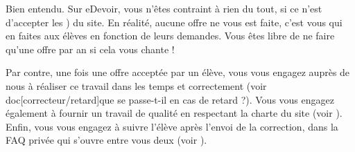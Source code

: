 ﻿Bien entendu. Sur eDevoir, vous n'êtes contraint à rien du tout, si ce n'est d'accepter les ) du site. En réalité, aucune offre ne vous est faite, c'est vous qui en faites aux élèves en fonction de leurs demandes. Vous êtes libre de ne faire qu'une offre par an si cela vous chante !

Par contre, une fois une offre acceptée par un élève, vous vous engagez auprès de nous à réaliser ce travail dans les temps et correctement (voir doc[correcteur/retard]{que se passe-t-il en cas de retard} ?). Vous vous engagez également à fournir un travail de qualité en respectant la charte du site (voir ). Enfin, vous vous engagez à suivre l'élève après l'envoi de la correction, dans la FAQ privée qui s'ouvre entre vous deux (voir ).